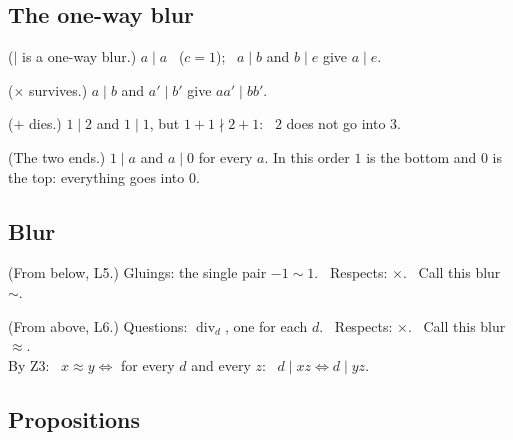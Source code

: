 \subsection*{The one-way blur}

\begin{lines}
\item[\lab{P1}] ($\mid$ is a one-way blur.) $a \mid a$ \ ($c = 1$); \ $a \mid b$ and $b \mid e$ give $a \mid e$.
\item[\lab{P2}] ($\times$ survives.) $a \mid b$ and $a' \mid b'$ give $a a' \mid b b'$.
\item[\lab{P3}] ($+$ dies.) $1 \mid 2$ and $1 \mid 1$, but $1 + 1 \nmid 2 + 1$: \ $2$ does not go into $3$.
\item[\lab{P4}] (The two ends.) $1 \mid a$ and $a \mid 0$ for every $a$. In this order $1$ is the bottom and $0$ is the top: everything goes into $0$.
\end{lines}

\subsection*{Blur}

\begin{lines}
\item[\lab{B1}] (From below, L5.) Gluings: the single pair $-1 \sim 1$. \ Respects: $\times$. \ Call this blur $\sim$.
\item[\lab{B2}] (From above, L6.) Questions: $\operatorname{div}_d$, one for each $d$. \ Respects: $\times$. \ Call this blur $\approx$. \\
By Z3: \ $x \approx y \iff$ for every $d$ and every $z$: \ $d \mid x z \Leftrightarrow d \mid y z$.
\end{lines}

\subsection*{Propositions}

